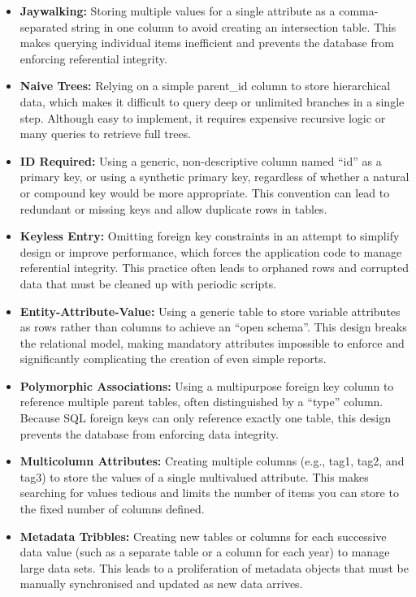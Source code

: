 \begin{itemize}
    \item \textbf{Jaywalking:}  Storing multiple values for a single attribute as a comma-separated string in one column to avoid creating an intersection table. This makes querying individual items inefficient and prevents the database from enforcing referential integrity.
    \item \textbf{Naive Trees:}  Relying on a simple parent\_id column to store hierarchical data, which makes it difficult to query deep or unlimited branches in a single step. Although easy to implement, it requires expensive recursive logic or many queries to retrieve full trees.
    \item \textbf{ID Required:}  Using a generic, non-descriptive column named “id” as a primary key, or using a synthetic primary key, regardless of whether a natural or compound key would be more appropriate. This convention can lead to redundant or missing keys and allow duplicate rows in tables.
    \item \textbf{Keyless Entry:}  Omitting foreign key constraints in an attempt to simplify design or improve performance, which forces the application code to manage referential integrity. This practice often leads to orphaned rows and corrupted data that must be cleaned up with periodic scripts.
    \item \textbf{Entity-Attribute-Value:}  Using a generic table to store variable attributes as rows rather than columns to achieve an “open schema”. This design breaks the relational model, making mandatory attributes impossible to enforce and significantly complicating the creation of even simple reports.
    \item \textbf{Polymorphic Associations:}  Using a multipurpose foreign key column to reference multiple parent tables, often distinguished by a “type” column. Because SQL foreign keys can only reference exactly one table, this design prevents the database from enforcing data integrity.
    \item \textbf{Multicolumn Attributes:}  Creating multiple columns (e.g., tag1, tag2, and tag3) to store the values of a single multivalued attribute. This makes searching for values tedious and limits the number of items you can store to the fixed number of columns defined.
    \item \textbf{Metadata Tribbles:}  Creating new tables or columns for each successive data value (such as a separate table or a column for each year) to manage large data sets. This leads to a proliferation of metadata objects that must be manually synchronised and updated as new data arrives.
\end{itemize}

